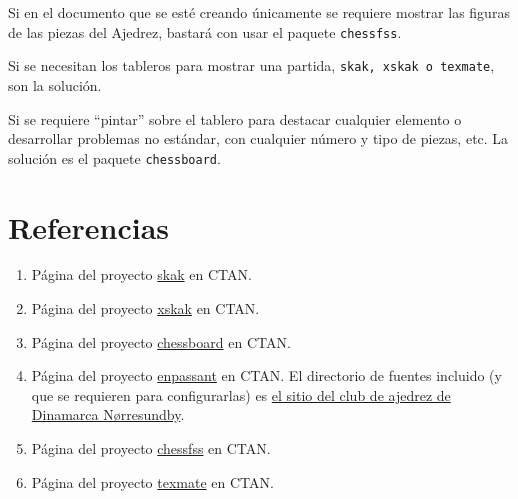 \documentclass[a4paper,10pt, twocolumn]{article}
\begin{document}
        Si en el documento que se esté creando únicamente se requiere mostrar las figuras de las piezas del Ajedrez, bastará con usar el paquete {\tt chessfss}.
        
        Si se necesitan los tableros para mostrar una partida, {\tt skak, xskak o texmate}, son la solución.
        
        Si se requiere “pintar” sobre el tablero para destacar cualquier elemento o desarrollar problemas no estándar, con cualquier número y tipo de piezas, etc. La solución es el paquete {\tt chessboard}.
        
     \section{Referencias}
     
     \begin{enumerate}
         
         \item Página del proyecto \href{https://www.ctan.org/pkg/skak}{skak} en CTAN.
         
         \item Página del proyecto \href{https://www.ctan.org/tex-archive/macros/latex/contrib/xskak?lang=en}{xskak} en CTAN.
         
         \item Página del proyecto \href{https://www.ctan.org/tex-archive/macros/latex/contrib/chessboard?lang=en}{chessboard} en CTAN.
         
         \item Página del proyecto \href{https://www.ctan.org/pkg/enpassant?lang=en}{enpassant} en CTAN. El directorio de fuentes incluido (y que se requieren para configurarlas) es \href{http://www.enpassant.dk/}{el sitio del club de ajedrez de Dinamarca Nørresundby}.
         
         \item Página del proyecto \href{https://www.ctan.org/pkg/chessfss?lang=en}{chessfss} en CTAN.
         
         \item Página del proyecto \href{https://www.ctan.org/pkg/texmate}{texmate} en CTAN.
         
        \end{enumerate}
\end{document}
